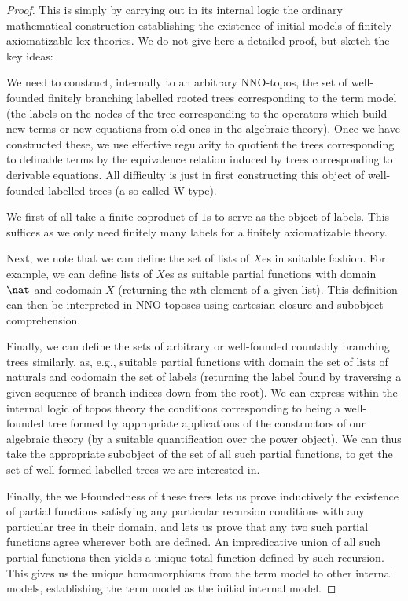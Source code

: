 \begin{proof}
This is simply by carrying out in its internal logic the ordinary mathematical construction establishing the existence of initial models of finitely axiomatizable lex theories. We do not give here a detailed proof, but sketch the key ideas:

We need to construct, internally to an arbitrary NNO-topos, the set of well-founded finitely branching labelled rooted trees corresponding to the term model (the labels on the nodes of the tree corresponding to the operators which build new terms or new equations from old ones in the algebraic theory). Once we have constructed these, we use effective regularity to quotient the trees corresponding to definable terms by the equivalence relation induced by trees corresponding to derivable equations. All difficulty is just in first constructing this object of well-founded labelled trees (a so-called W-type).

We first of all take a finite coproduct of $1$s to serve as the object of labels. This suffices as we only need finitely many labels for a finitely axiomatizable theory.

Next, we note that we can define the set of lists of $X$es in suitable fashion. For example, we can define lists of $X$es as suitable partial functions with domain $\nat$ and codomain $X$ (returning the $n$th element of a given list). This definition can then be interpreted in NNO-toposes using cartesian closure and subobject comprehension.

Finally, we can define the sets of arbitrary or well-founded countably branching trees similarly, as, e.g., suitable partial functions with domain the set of lists of naturals and codomain the set of labels (returning the label found by traversing a given sequence of branch indices down from the root). We can express within the internal logic of topos theory the conditions corresponding to being a well-founded tree formed by appropriate applications of the constructors of our algebraic theory (by a suitable quantification over the power object). We can thus take the appropriate subobject of the set of all such partial functions, to get the set of well-formed labelled trees we are interested in.

Finally, the well-foundedness of these trees lets us prove inductively the existence of partial functions satisfying any particular recursion conditions with any particular tree in their domain, and lets us prove that any two such partial functions agree wherever both are defined. An impredicative union of all such partial functions then yields a unique total function defined by such recursion. This gives us the unique homomorphisms from the term model to other internal models, establishing the term model as the initial internal model.


\end{proof}
